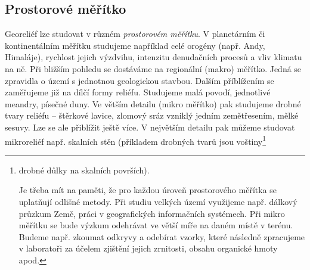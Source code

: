 \subsection{Prostorové měřítko}
Georeliéf lze studovat v různém \emph{prostorovém měřítku}. V planetárním či kontinentálním měřítku studujeme například celé orogény (např. Andy, Himaláje), rychlost jejich výzdvihu, intenzitu denudačních procesů a vliv klimatu na ně. Při bližším pohledu se dostáváme na regionální (makro) měřítko. Jedná se zpravidla o území s jednotnou geologickou stavbou. Dalším příblížením se zaměřujeme již na dílčí formy reliéfu. Studujeme malá povodí, jednotlivé meandry, písečné duny. Ve větším detailu (mikro měřítko) pak studujeme drobné tvary reliéfu -- štěrkové lavice, zlomový sráz vzniklý jedním zemětřesením, mělké sesuvy. Lze se ale přiblížit ještě více. V největším detailu pak můžeme studovat mikroreliéf např. skalních stěn (příkladem drobných tvarů jsou voštiny\footnote{drobné důlky na skalních površích). 

Je třeba mít na paměti, že pro každou úroveň prostorového měřítka se uplatňují odlišné metody. Při studiu velkých území využijeme např. dálkový průzkum Země, práci v geografických informačních systémech. Při mikro měřítku se bude výzkum odehrávat ve větší míře na daném místě v terénu. Budeme např. zkoumat odkryvy a odebírat vzorky, které následně zpracujeme v laboratoři za účelem zjištění jejich zrnitosti, obsahu organické hmoty apod.

}
